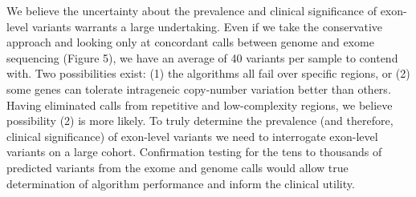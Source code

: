 \documentclass{article}\usepackage[]{graphicx}\usepackage[]{color}
\begin{document}
We believe the uncertainty about the prevalence and clinical significance of exon-level variants warrants a large undertaking.
Even if we take the conservative approach and looking only at concordant calls between genome and exome sequencing (Figure 5), we have an average of 40 variants per sample to contend with.
Two possibilities exist: (1) the algorithms all fail over specific regions, or (2) some genes can tolerate intrageneic copy-number variation better than others.
Having eliminated calls from repetitive and low-complexity regions, we believe possibility (2) is more likely.
To truly determine the prevalence (and therefore, clinical significance) of exon-level variants we need to interrogate exon-level variants on a large cohort.
Confirmation testing for the tens to thousands of predicted variants from the exome and genome calls would allow true determination of algorithm performance and inform the clinical utility.




\end{document}
